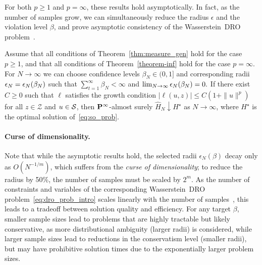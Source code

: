 For both $p\geq 1$ and $p = \infty$, these results hold asymptotically. In fact, as the number of samples grow, we can simultaneously reduce the radius $\epsilon$ and the violation level $\beta$, and prove asymptotic consistency of the Wasserstein~\gls{DRO} problem~\cite{kuhn2019wasserstein}. 
\begin{theorem}
  \label{thm:asymp_dro}
  Assume that all conditions of Theorem~\ref{thm:measure_gen} hold for the case $p\geq 1$, and that all conditions of Theorem~\ref{theorem-inf} hold for the case $p= \infty$. 
  For $N \rightarrow \infty$ we can choose confidence levels $\beta_N \in (0,1]$ and corresponding radii $\epsilon_N=\epsilon_N(\beta_N)$ such that $\sum_{t=1}^\infty \beta_N < \infty$ and $\lim_{N \rightarrow \infty} \epsilon_N(\beta_N)= 0.$ If there exist $C\geq 0$ such that $\ell$ satisfies the growth condition $|\ell(u,z)| \leq C(1+\|u\|^p)$ for all $z\in \mathcal{Z}$ and $u\in\mathcal{S}$, then 
  ${\mathbf P}^{\infty}$-almost surely $\hat{H}_N \downarrow H^\star$ as $N \to \infty$, where $H^\star$ is the optimal solution of~\eqref{eq:so_prob}.
\end{theorem}

\paragraph{Curse of dimensionality.}
Note that while the asymptotic results hold, the selected radii $\epsilon_N(\beta)$ decay only as $O(N^{-1/m})$, which suffers from the {\it curse of dimensionality}; to reduce the radius by 50\%, the number of samples must be scaled by $2^m$. As the number of constraints and variables of the corresponding Wasserstein~\gls{DRO} problem~\eqref{eq:dro_prob_intro} scales linearly with the number of samples~\cite{mohajerin_esfahani_data-driven_2018}, this leads to a tradeoff between solution quality and efficiency. For any target $\beta$, smaller sample sizes lead to problems that are highly tractable but likely conservative, as more distributional ambiguity (larger radii) is considered, while larger sample sizes lead to reductions in the conservatism level (smaller radii), but may have prohibitive solution times due to the exponentially larger problem sizes. 


